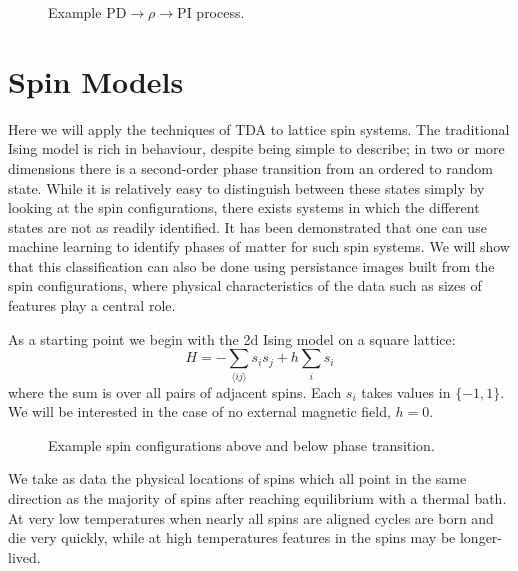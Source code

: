 \documentclass[11pt]{article}
\begin{document}
\begin{figure}[b]
    \centering
    \caption{Example PD$\rightarrow\rho\rightarrow$PI process.}
\end{figure}



\section{Spin Models}
Here we will apply the techniques of TDA to lattice spin systems. The traditional Ising model is rich in behaviour, despite being simple to describe; in two or more dimensions there is a second-order phase transition from an ordered to random state. While it is relatively easy to distinguish between these states simply by looking at the spin configurations, there exists systems in which the different states are not as readily identified. It has been demonstrated that one can use machine learning to identify phases of matter for such spin systems. We will show that this classification can also be done using persistance images built from the spin configurations, where physical characteristics of the data such as sizes of features play a central role.

As a starting point we begin with the 2d Ising model on a square lattice:
\begin{equation}
    H = -\sum_{\langle ij\rangle}s_is_j + h\sum_is_i
\end{equation}
where the sum is over all pairs of adjacent spins. Each $s_i$ takes values in $\{-1,1\}$. We will be interested in the case of no external magnetic field, $h=0$.

\begin{figure}[t]
    \centering
    \caption{Example spin configurations above and below phase transition.}
\end{figure}

We take as data the physical locations of spins which all point in the same direction as the majority of spins after reaching equilibrium with a thermal bath. At very low temperatures when nearly all spins are aligned cycles are born and die very quickly, while at high temperatures features in the spins may be longer-lived.
\end{document}
